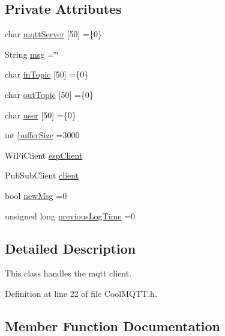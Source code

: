\subsection*{Private Attributes}
\begin{DoxyCompactItemize}
\item 
char \hyperlink{classCoolMQTT_ab8bb951f87ddbf92db74c2ad16a3e53e}{mqtt\+Server} \mbox{[}50\mbox{]} =\{\textquotesingle{}0\textquotesingle{}\}
\item 
String \hyperlink{classCoolMQTT_af6b19e7074dbbb4ae493c44dcb53f7ff}{msg} =\char`\"{}\char`\"{}
\item 
char \hyperlink{classCoolMQTT_a4492f52a441e83cc5151010317fdb52d}{in\+Topic} \mbox{[}50\mbox{]} =\{\textquotesingle{}0\textquotesingle{}\}
\item 
char \hyperlink{classCoolMQTT_a109c786a17b463f9eeba046194279522}{out\+Topic} \mbox{[}50\mbox{]} =\{\textquotesingle{}0\textquotesingle{}\}
\item 
char \hyperlink{classCoolMQTT_a8cd47e45d457f908d4b4390b35aaee83}{user} \mbox{[}50\mbox{]} =\{\textquotesingle{}0\textquotesingle{}\}
\item 
int \hyperlink{classCoolMQTT_a7f3cf26b51d6770f216e42c5ef13ca9f}{buffer\+Size} =3000
\item 
Wi\+Fi\+Client \hyperlink{classCoolMQTT_acc30a0200967374a524092a8a806502a}{esp\+Client}
\item 
Pub\+Sub\+Client \hyperlink{classCoolMQTT_a4ca71e4f76ef868692a297efd45b1415}{client}
\item 
bool \hyperlink{classCoolMQTT_a3240388137b885775aadf38e96b24c6b}{new\+Msg} =0
\item 
unsigned long \hyperlink{classCoolMQTT_a3db37ef9ed3b05b2a8d44edba0e7d3cc}{previous\+Log\+Time} =0
\end{DoxyCompactItemize}


\subsection{Detailed Description}
This class handles the mqtt client. 

Definition at line 22 of file Cool\+M\+Q\+T\+T.\+h.



\subsection{Member Function Documentation}
\mbox{\label{classCoolMQTT_ac9248808641ebf3054ed0620ea9d0100}} 
